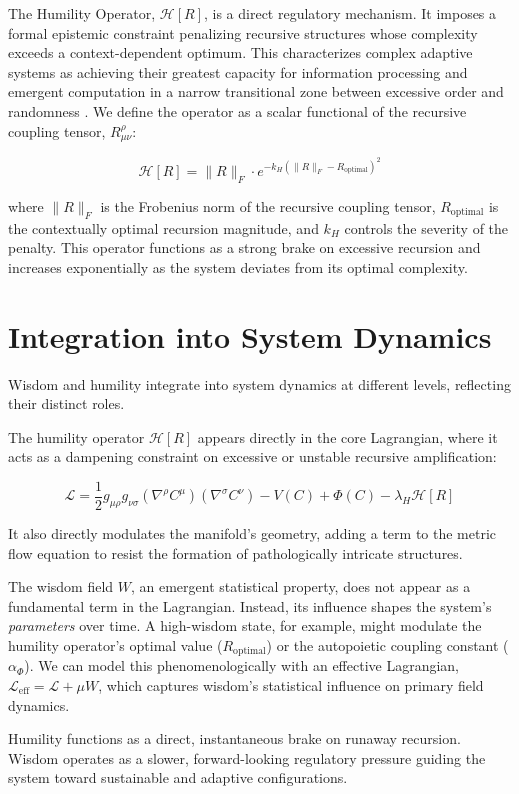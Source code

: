 The Humility Operator, \(\mathcal{H}[R]\), is a direct regulatory mechanism. It imposes a formal epistemic constraint penalizing recursive structures whose complexity exceeds a context-dependent optimum. This characterizes complex adaptive systems as achieving their greatest capacity for information processing and emergent computation in a narrow transitional zone between excessive order and randomness \autocite{Langton1990}. We define the operator as a scalar functional of the recursive coupling tensor, \(R^\rho_{\mu\nu}\):

\begin{equation}
\mathcal{H}[R] = \|R\|_F \cdot e^{-k_H(\|R\|_F - R_{\text{optimal}})^2}
\end{equation}

where \(\|R\|_F\) is the Frobenius norm of the recursive coupling tensor, \(R_{\text{optimal}}\) is the contextually optimal recursion magnitude, and \(k_H\) controls the severity of the penalty. This operator functions as a strong brake on excessive recursion and increases exponentially as the system deviates from its optimal complexity.


\section{Integration into System Dynamics}
\label{8.4:integration_into_system_dynamics}

Wisdom and humility integrate into system dynamics at different levels, reflecting their distinct roles.

The humility operator \(\mathcal{H}[R]\) appears directly in the core Lagrangian, where it acts as a dampening constraint on excessive or unstable recursive amplification:

\begin{equation}
\mathcal{L} = \frac{1}{2} g_{\mu\rho} g_{\nu\sigma} (\nabla^\rho C^\mu)(\nabla^\sigma C^\nu) - V(C) + \Phi(C) - \lambda_H \mathcal{H}[R]
\end{equation}

It also directly modulates the manifold's geometry, adding a term to the metric flow equation to resist the formation of pathologically intricate structures.

The wisdom field \(W\), an emergent statistical property, does not appear as a fundamental term in the Lagrangian. Instead, its influence shapes the system's \textit{parameters} over time. A high-wisdom state, for example, might modulate the humility operator's optimal value (\(R_{\text{optimal}}\)) or the autopoietic coupling constant (\(\alpha_{\Phi}\)). We can model this phenomenologically with an effective Lagrangian, \(\mathcal{L}_{\text{eff}} = \mathcal{L} + \mu W\), which captures wisdom's statistical influence on primary field dynamics.

Humility functions as a direct, instantaneous brake on runaway recursion. Wisdom operates as a slower, forward-looking regulatory pressure guiding the system toward sustainable and adaptive configurations.